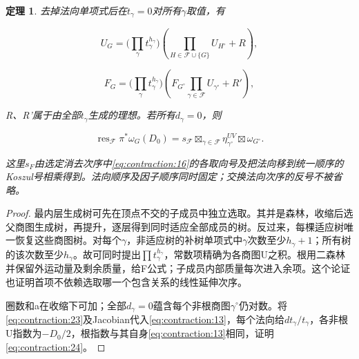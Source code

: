 \documentclass[11pt,a4paper,oneside]{ctexrep}
\theoremstyle{cnplain}
\newtheorem{theorem}{定理}[chapter]
\theoremstyle{definition}
\theoremstyle{remark}
\begin{document}
\begin{theorem}

\label{thm:contraction:6.1} 去掉法向单项式后在\(t_\gamma =0\)对所有\(\gamma \)取值，有

\begin{equation}
U_G=\Big(\prod_\gamma t_\gamma^{h_\gamma}\Big)
       \left(\prod_{H\in\mathscr F\cup\{G\}}U_{H^\circ}+R\right),
\end{equation}

\begin{equation}
F_G=\Big(\prod_\gamma t_\gamma^{h_\gamma}\Big)
       \left(F_{G^\circ}\prod_{\gamma\in\mathscr F}U_{\gamma^\circ}
                                                       +R'\right),          \label{eq:contraction:23}
\end{equation}

R、R'属于由全部\(t_\gamma \)生成的理想。若所有\(d_\gamma =0\)，则

\begin{equation}
\operatorname{res}_{\mathscr F}\pi^*\omega_G(D_0)
        =s_{\mathscr F}\mathop{\boxtimes}_{\gamma\in\mathscr F}\eta_{\gamma^\circ}^{UV}
                                                \boxtimes\omega_{G^\circ}.
                                                                    \label{eq:contraction:24}
\end{equation}

这里\(s_F\)由选定消去次序中\eqref{eq:contraction:16}的各取向号及把法向移到统一顺序的Koszul号相乘得到。法向顺序及因子顺序同时固定；交换法向次序的反号不被省略。

\end{theorem}

\begin{proof}

最内层生成树可先在顶点不交的子成员中独立选取。其并是森林，收缩后选父商图生成树，再提升，逐层得到同时适应全部成员的树。反过来，每棵适应树唯一恢复这些商图树。对每个\(\gamma \)，非适应树的补树单项式中\(\gamma \)次数至少\(h_\gamma +1\)；所有树的该次数至少\(h_\gamma \)。故可同时提出\(\prod t_\gamma ^{h_\gamma }\)，常数项精确为各商图U之积。根用二森林并保留外运动量及剩余质量，给F公式；子成员内部质量每次进入余项。这个论证也证明首项不依赖选取哪一个包含关系的线性延伸次序。

圈数和a在收缩下可加；全部\(d_\gamma =0\)蕴含每个非根商图\(\gamma ^\circ\)仍对数。将\eqref{eq:contraction:23}及Jacobian代入\eqref{eq:contraction:13}，每个法向给\(dt_\gamma /t_\gamma \)，各非根U指数为\(- D_0/2\)，根指数与其自身\eqref{eq:contraction:13}相同，证明\eqref{eq:contraction:24}。

\end{proof}
\end{document}
